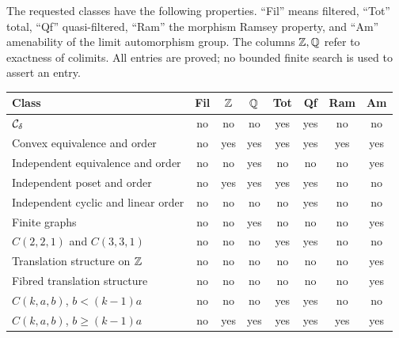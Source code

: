 \begin{theorem}
\label{F:companion-table}
The requested classes have the following properties. ``Fil'' means
filtered, ``Tot'' total, ``Qf'' quasi-filtered, ``Ram'' the morphism
Ramsey property, and ``Am'' amenability of the limit automorphism
group. The columns $\mathbb Z,\mathbb Q$ refer to exactness of colimits. All entries
are proved; no bounded finite search is used to assert an entry.
\begin{center}
\small
\setlength{\tabcolsep}{4pt}
\begin{tabular}{lccccccc}
\toprule
Class & Fil & $\mathbb Z$ & $\mathbb Q$ & Tot & Qf & Ram & Am\\
\midrule
$\mathcal C_\delta$ & no & no & no & yes & yes & no & no\\
Convex equivalence and order & no & yes & yes & yes & yes & yes & yes\\
Independent equivalence and order & no & no & yes & no & no & no & yes\\
Independent poset and order & no & yes & yes & yes & yes & no & no\\
Independent cyclic and linear order & no & no & no & no & yes & no & no\\
Finite graphs & no & no & yes & no & no & no & yes\\
$C(2,2,1)$ and $C(3,3,1)$ & no & no & no & yes & yes & no & no\\
Translation structure on $\mathbb Z$ & no & no & no & no & no & no & yes\\
Fibred translation structure & no & no & no & no & no & no & yes\\
$C(k,a,b)$, $b<(k-1)a$ & no & no & no & yes & yes & no & no\\
$C(k,a,b)$, $b\geq(k-1)a$ & no & yes & yes & yes & yes & yes & yes\\
\bottomrule
\end{tabular}
\end{center}
\end{theorem}
